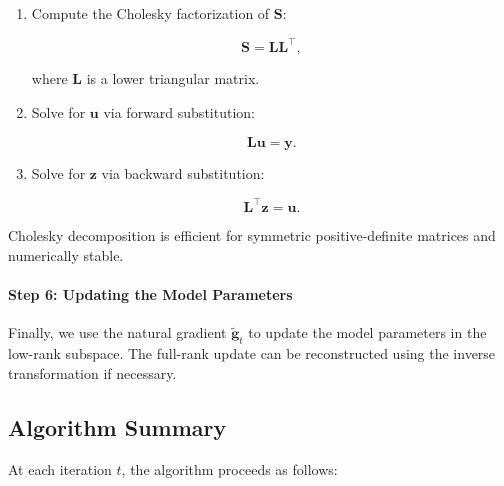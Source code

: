 \begin{enumerate}
    \item Compute the Cholesky factorization of $\mathbf{S}$:

    \[
    \mathbf{S} = \mathbf{L} \mathbf{L}^\top,
    \]

    where $\mathbf{L}$ is a lower triangular matrix.

    \item Solve for $\mathbf{u}$ via forward substitution:

    \[
    \mathbf{L} \mathbf{u} = \mathbf{y}.
    \]

    \item Solve for $\mathbf{z}$ via backward substitution:

    \[
    \mathbf{L}^\top \mathbf{z} = \mathbf{u}.
    \]
\end{enumerate}

Cholesky decomposition is efficient for symmetric positive-definite matrices and numerically stable.

\paragraph{Step 6: Updating the Model Parameters}



Finally, we use the natural gradient $\tilde{\mathbf{g}}_t$ to update the model parameters in the low-rank subspace. The full-rank update can be reconstructed using the inverse transformation if necessary.

\subsection{Algorithm Summary}

At each iteration $t$, the algorithm proceeds as follows:

